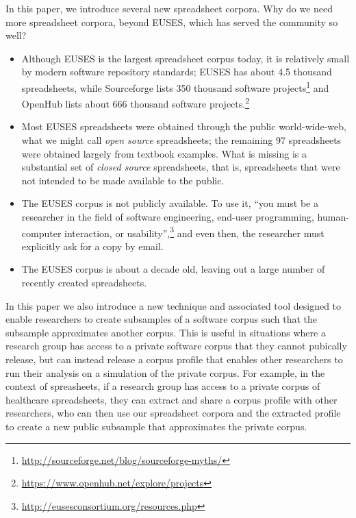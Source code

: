 \documentclass[conference]{IEEEtran}
\begin{document}
In this paper, we introduce several new spreadsheet corpora.
Why do we need more spreadsheet corpora, beyond EUSES, which has served the community so well?
\begin{itemize}
  \item
  	Although EUSES is the largest spreadsheet corpus today, it is relatively small by
  	modern software repository standards; EUSES has about 4.5 thousand spreadsheets, while 
  	Sourceforge lists 350 thousand software projects\footnote{\url{http://sourceforge.net/blog/sourceforge-myths/}} 
  	and OpenHub lists about 666 thousand
  	software projects.\footnote{\url{https://www.openhub.net/explore/projects}}
  \item
  	Most EUSES spreadsheets were obtained through the public world-wide-web,
  	what we might call \emph{open source} spreadsheets; the remaining 97 spreadsheets were obtained
  	largely from textbook examples. What is missing is a substantial set of \emph{closed source} spreadsheets, that is,
  	spreadsheets that were not intended to be made available to the public.
  \item
  	The EUSES corpus is not publicly available. To use it, ``you must be a researcher in the field of 
  	software engineering, end-user programming, human-computer interaction, or 
  	usability'',\footnote{\url{http://eusesconsortium.org/resources.php}} 
  	and even then, the researcher must explicitly ask for a copy by email.
  \item
  	The EUSES corpus is about a decade old, leaving out a large number of recently
  	created spreadsheets.
\end{itemize}

In this paper we also introduce a new technique and associated tool designed to enable researchers 
to create subsamples of a software corpus such that the subsample approximates 
another corpus.
This is useful in situations where a research group has access to a private software
corpus that they cannot pubically release, but can instead release a corpus profile
that enables other researchers to run their analysis on a simulation of the private corpus.
For example, in the context of spreasheets, if a research group has access to 
a private corpus of healthcare spreadsheets, they can extract and share a corpus profile
with other researchers, who can then use our spreadsheet corpora and the extracted profile to create
a new public subsample that approximates the private corpus.
\end{document}
